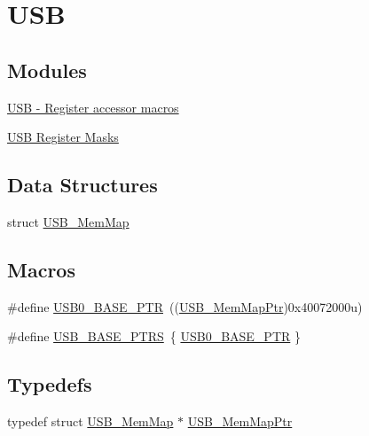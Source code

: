\hypertarget{group___u_s_b___peripheral}{}\section{U\+SB}
\label{group___u_s_b___peripheral}
\subsection*{Modules}
\begin{DoxyCompactItemize}
\item 
\hyperlink{group___u_s_b___register___accessor___macros}{U\+S\+B -\/ Register accessor macros}
\item 
\hyperlink{group___u_s_b___register___masks}{U\+S\+B Register Masks}
\end{DoxyCompactItemize}
\subsection*{Data Structures}
\begin{DoxyCompactItemize}
\item 
struct \hyperlink{struct_u_s_b___mem_map}{U\+S\+B\+\_\+\+Mem\+Map}
\end{DoxyCompactItemize}
\subsection*{Macros}
\begin{DoxyCompactItemize}
\item 
\#define \hyperlink{group___u_s_b___peripheral_ga598ff5eb20a0551af232710b3f27640a}{U\+S\+B0\+\_\+\+B\+A\+S\+E\+\_\+\+P\+TR}~((\hyperlink{group___u_s_b___peripheral_gaabd989a49827dc34abb5de32732f4125}{U\+S\+B\+\_\+\+Mem\+Map\+Ptr})0x40072000u)
\item 
\#define \hyperlink{group___u_s_b___peripheral_gabb481a231c7c57907377d7ee985f826c}{U\+S\+B\+\_\+\+B\+A\+S\+E\+\_\+\+P\+T\+RS}~\{ \hyperlink{group___u_s_b___peripheral_ga598ff5eb20a0551af232710b3f27640a}{U\+S\+B0\+\_\+\+B\+A\+S\+E\+\_\+\+P\+TR} \}
\end{DoxyCompactItemize}
\subsection*{Typedefs}
\begin{DoxyCompactItemize}
\item 
typedef struct \hyperlink{struct_u_s_b___mem_map}{U\+S\+B\+\_\+\+Mem\+Map} $\ast$ \hyperlink{group___u_s_b___peripheral_gaabd989a49827dc34abb5de32732f4125}{U\+S\+B\+\_\+\+Mem\+Map\+Ptr}
\end{DoxyCompactItemize}



